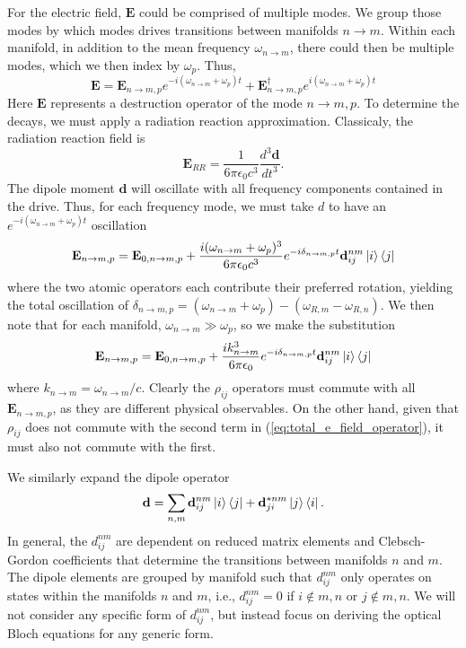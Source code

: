 \documentclass[final,5p,times,twocolumn]{elsarticle}
\begin{document}
For the electric field, $\mathbf{E}$ could be comprised of multiple modes.  We group those modes by which modes drives transitions between manifolds $n\rightarrow m$.  Within each manifold, in addition to the mean frequency $\omega_{n\rightarrow m}$, there could then be multiple modes, which we then index by $\omega_p$.  Thus,
\begin{equation}
	\mathbf{E} = \mathbf{E}_{n\rightarrow m, p} e^{-i (\omega_{n\rightarrow m} +\omega_p) t} + \mathbf{E}_{n\rightarrow m, p}^\dagger e^{i (\omega_{n\rightarrow m} +\omega_p) t}
\end{equation}
Here $\mathbf{E}$ represents a destruction operator of the mode $n\rightarrow m, p$.
To determine the decays, we must apply a radiation reaction approximation.  Classicaly, the radiation reaction field is
\begin{equation}
	\mathbf{E}_{RR} = \frac{1}{6\pi\epsilon_0 c^3}\frac{d^3\mathbf{d}}{dt^3}.
\end{equation}
The dipole moment $\mathbf{d}$ will oscillate with all frequency components contained in the drive.  Thus, for each frequency mode, we must take $d$ to have an $e^{-i (\omega_{n\rightarrow m}+\omega_p)t}$ oscillation
\begin{equation}
	\mathbf{E}_{n\rightarrow m,p} = \mathbf{E}_{0,n\rightarrow m,p} + \frac{i (\omega_{n\rightarrow m}+\omega_p)^3}{6\pi\epsilon_0c ^3}e^{-i\delta_{n\rightarrow m, p}t} \mathbf{d}^{nm}_{ij}\ket{i}\Bra{j}
\end{equation}
where the two atomic operators each contribute their preferred rotation, yielding the total oscillation of $\delta_{n\rightarrow m, p} = (\omega_{n\rightarrow m}+\omega_p)-(\omega_{R,m}-\omega_{R,n})$.
We then note that for each manifold, $\omega_{n\rightarrow m}\gg \omega_p$, so we make the substitution
\begin{equation}
	\label{eq:total_e_field_operator}
	\mathbf{E}_{n\rightarrow m,p} = \mathbf{E}_{0,n\rightarrow m,p} + \frac{i k_{n\rightarrow m}^3}{6\pi\epsilon_0 }e^{-i\delta_{n\rightarrow m, p}t} \mathbf{d}^{nm}_{ij}\ket{i}\Bra{j}
\end{equation}
where $k_{n\rightarrow m} = \omega_{n\rightarrow m}/c$.  Clearly the $\rho_{ij}$ operators must commute with all $\mathbf{E}_{n\rightarrow m,p}$, as they are different physical observables.  On the other hand, given that $\rho_{ij}$ does not commute with the second term in (\ref{eq:total_e_field_operator}), it must also not commute with the first.

We similarly expand the dipole operator
\begin{equation}
	\mathbf{d} = \sum_{n,m}\mathbf{d}^{nm}_{ij}\ket{i}\Bra{j} + \mathbf{d}^{*nm}_{ji}\ket{j}\Bra{i}.
\end{equation}
In general, the ${d}^{nm}_{ij}$ are dependent on reduced matrix elements and Clebsch-Gordon coefficients that determine the transitions between manifolds $n$ and $m$.  The dipole elements are grouped by manifold such that $d^{nm}_{ij}$ only operates on states within the manifolds $n$ and $m$, i.e., $d^{nm}_{ij}=0$ if $i\notin m,n$ or  $j\notin m,n$.  We will not consider any specific form of $d^{nm}_{ij}$, but instead focus on deriving the optical Bloch equations for any generic form.
\end{document}
